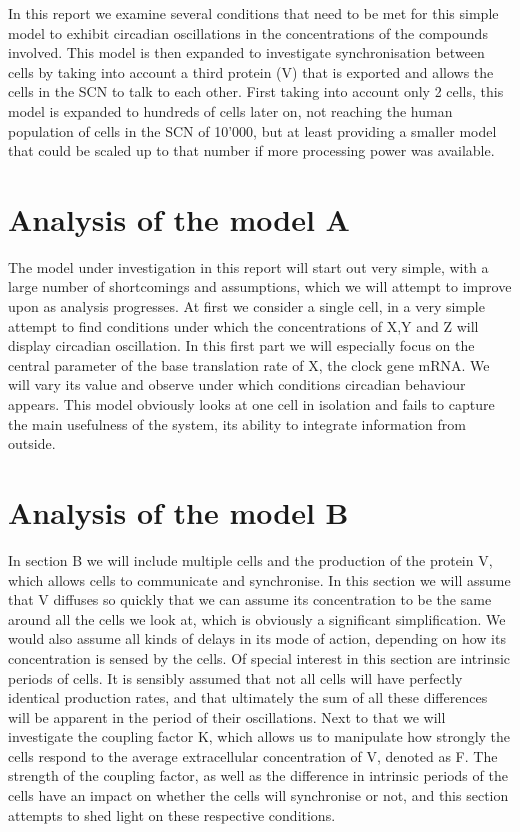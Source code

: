     In this report we examine several conditions that need to be met for this simple model to exhibit circadian oscillations in the concentrations of the compounds involved. This model is then expanded to investigate synchronisation between cells by taking into account a third protein (V) that is exported and allows the cells in the SCN to talk to each other. First taking into account only 2 cells, this model is expanded to hundreds of cells later on, not reaching the human population of cells in the SCN of 10'000, but at least providing a smaller model that could be scaled up to that number if more processing power was available. \par
    
    \section{Analysis of the model A}
    The model under investigation in this report will start out very simple, with a large number of shortcomings and assumptions, which we will attempt to improve upon as analysis progresses. At first we consider a single cell, in a very simple attempt to find conditions under which the concentrations of X,Y and Z will display circadian oscillation. In this first part we will especially focus on the central parameter of the base translation rate of X, the clock gene mRNA. We will vary its value and observe under which conditions circadian behaviour appears. This model obviously looks at one cell in isolation and fails to capture the main usefulness of the system, its ability to integrate information from outside. \par
    
    \section{Analysis of the model B}
    In section B we will include multiple cells and the production of the protein V, which allows cells to communicate and synchronise. In this section we will assume that V diffuses so quickly that we can assume its concentration to be the same around all the cells we look at, which is obviously a significant simplification. We would also assume all kinds of delays in its mode of action, depending on how its concentration is sensed by the cells. Of special interest in this section are intrinsic periods of cells. It is sensibly assumed that not all cells will have perfectly identical production rates, and that ultimately the sum of all these differences will be apparent in the period of their oscillations. Next to that we will investigate the coupling factor K, which allows us to manipulate how strongly the cells respond to the average extracellular concentration of V, denoted as F. The strength of the coupling factor, as well as the difference in intrinsic periods of the cells have an impact on whether the cells will synchronise or not, and this section attempts to shed light on these respective conditions.  \par
    
